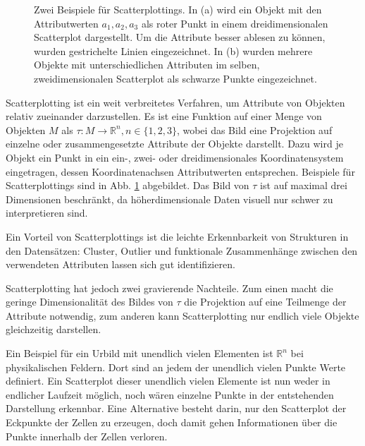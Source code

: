 \documentclass[a4paper,fontsize=12pt,toc=bib,halfparskip]{scrartcl}
\begin{document}
\begin{figure}
\begin{subfigure}{0.30\textwidth}
		\caption{}
	\end{subfigure}
	\hspace{2cm}
	\caption{Zwei Beispiele f\"ur Scatterplottings. In (a) wird ein Objekt mit den Attributwerten $a_1, a_2, a_3$ als roter Punkt in einem dreidimensionalen Scatterplot dargestellt. Um die Attribute besser ablesen zu k\"onnen, wurden gestrichelte Linien eingezeichnet. In (b) wurden mehrere Objekte mit unterschiedlichen Attributen im selben, zweidimensionalen Scatterplot als schwarze Punkte eingezeichnet.}
	\label{Scatterplots}
\end{figure}

Scatterplotting ist ein weit verbreitetes Verfahren, um Attribute von Objekten relativ zueinander darzustellen. Es ist eine Funktion auf einer Menge von Objekten $M$ als $\tau: M \rightarrow \mathbb{R}^n,n\in\{1,2,3\}$, wobei das Bild eine Projektion auf einzelne oder zusammengesetzte Attribute der Objekte darstellt.  Dazu wird je Objekt ein Punkt in ein ein-, zwei- oder dreidimensionales Koordinatensystem eingetragen, dessen Koordinatenachsen Attributwerten entsprechen. Beispiele f\"ur Scatterplottings sind in Abb. \ref{Scatterplots} abgebildet. Das Bild von $\tau$ ist auf maximal drei Dimensionen beschr\"ankt, da h\"oherdimensionale Daten visuell nur schwer zu interpretieren sind.

Ein Vorteil von Scatterplottings ist die leichte Erkennbarkeit von Strukturen in den Datens\"atzen: Cluster, Outlier und funktionale Zusammenh\"ange zwischen den verwendeten Attributen lassen sich gut identifizieren. 

Scatterplotting hat jedoch zwei gravierende Nachteile. Zum einen macht die geringe Dimensionalit\"at des Bildes von $\tau$ die Projektion auf eine Teilmenge der Attribute notwendig, zum anderen kann Scatterplotting nur endlich viele Objekte gleichzeitig darstellen. 

Ein Beispiel f\"ur ein Urbild mit unendlich vielen Elementen ist $\mathbb{R}^n$ bei physikalischen Feldern. Dort sind an jedem der unendlich vielen Punkte Werte definiert. Ein Scatterplot dieser unendlich vielen Elemente ist nun weder in endlicher Laufzeit m\"oglich, noch w\"aren einzelne Punkte in der entstehenden Darstellung erkennbar. Eine Alternative besteht darin, nur den Scatterplot der Eckpunkte der Zellen zu erzeugen, doch damit gehen Informationen \"uber die Punkte innerhalb der Zellen verloren.
\end{document}
